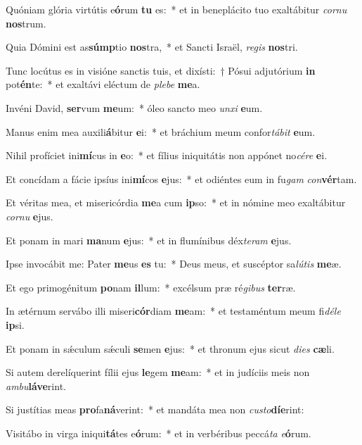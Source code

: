 \item Quóniam glória virtútis e\textbf{ó}rum \textbf{tu} es:~* et in beneplácito tuo exaltábitur \textit{cor}\textit{nu} \textbf{nos}trum.
\item Quia Dómini est as\textbf{súmp}tio \textbf{nos}tra,~* et Sancti Israël, \textit{re}\textit{gis} \textbf{nos}tri.
\item Tunc locútus es in visióne sanctis tuis, et dixísti:~† Pósui adjutórium \textbf{in} pot\textbf{én}te:~* et exaltávi eléctum de \textit{ple}\textit{be} \textbf{me}a.
\item Invéni David, \textbf{ser}vum \textbf{me}um:~* óleo sancto meo \textit{un}\textit{xi} \textbf{e}um.
\item Manus enim mea auxili\textbf{á}bitur \textbf{e}i:~* et bráchium meum confor\textit{tá}\textit{bit} \textbf{e}um.
\item Nihil profíciet ini\textbf{mí}cus in \textbf{e}o:~* et fílius iniquitátis non appónet no\textit{cé}\textit{re} \textbf{e}i.
\item Et concídam a fácie ipsíus ini\textbf{mí}cos \textbf{e}jus:~* et odiéntes eum in fu\textit{gam} \textit{con}\textbf{vér}tam.
\item Et véritas mea, et misericórdia \textbf{me}a cum \textbf{ip}so:~* et in nómine meo exaltábitur \textit{cor}\textit{nu} \textbf{e}jus.
\item Et ponam in mari \textbf{ma}num \textbf{e}jus:~* et in flumínibus déx\textit{te}\textit{ram} \textbf{e}jus.
\item Ipse invocábit me: Pater \textbf{me}us \textbf{es} tu:~* Deus meus, et suscéptor sa\textit{lú}\textit{tis} \textbf{me}æ.
\item Et ego primogénitum \textbf{po}nam \textbf{il}lum:~* excélsum præ ré\textit{gi}\textit{bus} \textbf{ter}ræ.
\item In ætérnum servábo illi miseri\textbf{cór}diam \textbf{me}am:~* et testaméntum meum fi\textit{dé}\textit{le} \textbf{ip}si.
\item Et ponam in sǽculum sǽculi \textbf{se}men \textbf{e}jus:~* et thronum ejus sicut \textit{di}\textit{es} \textbf{cæ}li.
\item Si autem derelíquerint fílii ejus \textbf{le}gem \textbf{me}am:~* et in judíciis meis non \textit{am}\textit{bu}\textbf{lá}\textbf{ve}rint.
\item Si justítias meas \textbf{pro}fa\textbf{ná}verint:~* et mandáta mea non \textit{cus}\textit{to}\textbf{dí}\textbf{e}rint:
\item Visitábo in virga iniqui\textbf{tá}tes e\textbf{ó}rum:~* et in verbéribus peccá\textit{ta} \textit{e}\textbf{ó}rum.
